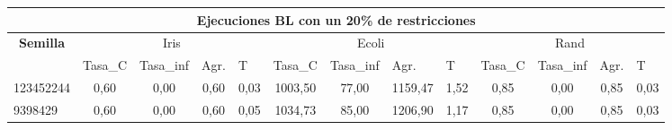 \documentclass[12pt, spanish]{article}
\begin{document}
\begin{table}[H]

\small

\begin{adjustwidth}{-1cm}{-1cm}%


\begin{tabular}{|l|c|c|c|c|c|c|c|c|c|c|c|c|}
\hline
\multicolumn{13}{|c|}{\textbf{Ejecuciones BL con un 20\% de restricciones}}                                                                                                                                                                                                                                                                                                                                            \\ \hline
\multicolumn{1}{|c|}{\multirow{2}{*}{\textbf{Semilla}}} & \multicolumn{4}{c|}{Iris}                                                                                          & \multicolumn{4}{c|}{Ecoli}                                                                                         & \multicolumn{4}{c|}{Rand}                                                                                          \\ \cline{2-13} 
\multicolumn{1}{|c|}{}                                  & \multicolumn{1}{l|}{Tasa\_C} & \multicolumn{1}{l|}{Tasa\_inf} & \multicolumn{1}{l|}{Agr.} & \multicolumn{1}{l|}{T} & \multicolumn{1}{l|}{Tasa\_C} & \multicolumn{1}{l|}{Tasa\_inf} & \multicolumn{1}{l|}{Agr.} & \multicolumn{1}{l|}{T} & \multicolumn{1}{l|}{Tasa\_C} & \multicolumn{1}{l|}{Tasa\_inf} & \multicolumn{1}{l|}{Agr.} & \multicolumn{1}{l|}{T} \\ \hline
123452244                                               & 0,60                         & 0,00                           & 0,60                      & 0,03                   & 1003,50                      & 77,00                          & 1159,47                   & 1,52                   & 0,85                         & 0,00                           & 0,85                      & 0,03                   \\ \hline
9398429                                                 & 0,60                         & 0,00                           & 0,60                      & 0,05                   & 1034,73                      & 85,00                          & 1206,90                   & 1,17                   & 0,85                         & 0,00                           & 0,85                      & 0,03                   \\ \hline

\end{tabular}
\end{adjustwidth}
\end{table}
\end{document}
